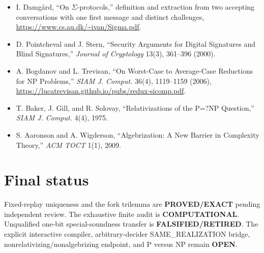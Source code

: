 \documentclass[11pt]{article}
\newcommand{\st}[1]{\textbf{#1}}
\begin{document}
\begin{itemize}
\item I. Damg\aa rd, ``On $\Sigma$-protocols,'' definition and extraction from
two accepting conversations with one first message and distinct challenges,
\url{https://www.cs.au.dk/~ivan/Sigma.pdf}.
\item D. Pointcheval and J. Stern, ``Security Arguments for Digital
Signatures and Blind Signatures,'' \emph{Journal of Cryptology} 13(3),
361--396 (2000).
\item A. Bogdanov and L. Trevisan, ``On Worst-Case to Average-Case Reductions
for NP Problems,'' \emph{SIAM J. Comput.} 36(4), 1119--1159 (2006),
\url{https://lucatrevisan.github.io/pubs/redux-sicomp.pdf}.
\item T. Baker, J. Gill, and R. Solovay, ``Relativizations of the P=?NP
Question,'' \emph{SIAM J. Comput.} 4(4), 1975.
\item S. Aaronson and A. Wigderson, ``Algebrization: A New Barrier in
Complexity Theory,'' \emph{ACM TOCT} 1(1), 2009.
\end{itemize}

\section*{Final status}

Fixed-replay uniqueness and the fork trilemma are \st{PROVED/EXACT} pending
independent review.  The exhaustive finite audit is \st{COMPUTATIONAL}.
Unqualified one-bit special-soundness transfer is \st{FALSIFIED/RETIRED}.
The explicit interactive compiler, arbitrary-decider SAME\_REALIZATION bridge,
nonrelativizing/nonalgebrizing endpoint, and P versus NP remain \st{OPEN}.

\end{document}
